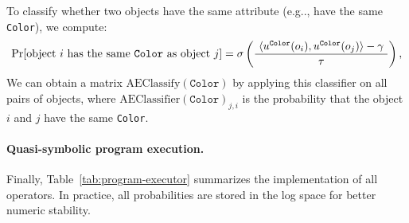 \documentclass{article} %
\makeatletter
\newcommand{\sigmoid}{\sigma}
\newcommand{\tbl}[1]{Table~\ref{#1}}
\DeclareRobustCommand\onedot{\futurelet\@let@token\@onedot}
\def\@onedot{\ifx\@let@token.\else.\null\fi\xspace}
\def\eg{e.g\onedot} \def\Eg{E.g\onedot}
\makeatother
\begin{document}
To classify whether two objects have the same attribute (\eg, have the same \texttt{Color}), we compute:
\[ \Pr[\text{object $i$ has the same \texttt{Color} as object $j$}] = 
\sigmoid \left( \frac{{~\langle u^{\texttt{Color}}(o_i), u^{\texttt{Color}}(o_j) \rangle - \gamma}~}{\tau} \right),
\]
We can obtain a matrix $\mathrm{AEClassify}(\texttt{Color})$ by applying this classifier on all pairs of objects, where $\mathrm{AEClassifier}(\texttt{Color})_{j, i}$ is the probability that the object $i$ and $j$ have the same \texttt{Color}.

\paragraph{Quasi-symbolic program execution.} Finally, \tbl{tab:program-executor} summarizes the implementation of all operators. In practice, all probabilities are stored in the log space for better numeric stability.
\end{document}
